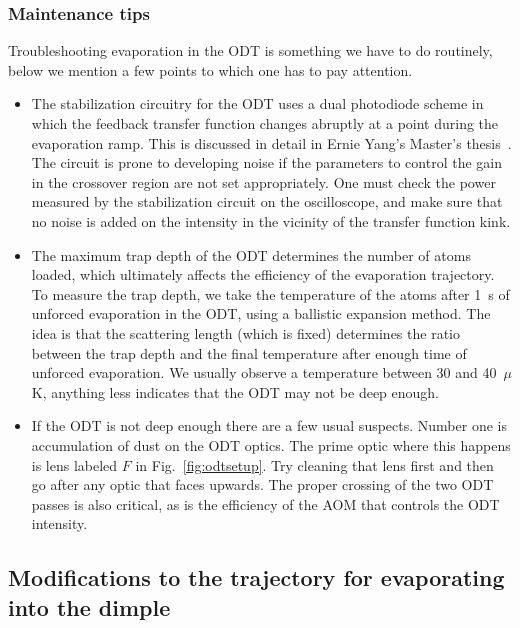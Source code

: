 \subsubsection{Maintenance tips}

Troubleshooting evaporation in the ODT is something we have to do routinely,
below we mention a few points to which one has to pay attention. 

\begin{itemize}
\item The stabilization circuitry for the ODT uses a dual photodiode scheme in
which the feedback transfer function changes abruptly at a point during the
evaporation ramp.  This is discussed in detail in Ernie Yang's Master's
thesis~\cite{ErnieMs}.  The circuit is prone to developing noise if the
parameters to control the gain in the crossover region are not set
appropriately.  One must check the power measured by the stabilization circuit
on the oscilloscope, and make sure that no noise is added on the intensity in
the vicinity of the transfer function kink.  

\item The maximum trap depth of the ODT determines the number of atoms loaded,
which ultimately affects the efficiency of the evaporation trajectory.  To
measure the trap depth, we take the temperature of the atoms after 1~s of
unforced evaporation in the ODT, using a ballistic expansion method.  The idea
is that the scattering length (which is fixed) determines the ratio between the
trap depth and the final temperature after enough time of unforced evaporation.
We usually observe a temperature between 30 and 40~$\mu$K, anything less
indicates that the ODT may not be deep enough.

\item If the ODT is not deep enough there are a few usual suspects.  Number one
is accumulation of dust on the ODT optics.  The prime optic where this happens
is lens labeled $F$ in Fig.~\ref{fig:odtsetup}. Try cleaning that lens first
and then go after any optic that faces upwards.  The proper
crossing of the two ODT passes is also critical, as is the efficiency of the
AOM that controls the ODT intensity. 

\end{itemize} 

\subsection{Modifications to the trajectory for evaporating into the dimple}

